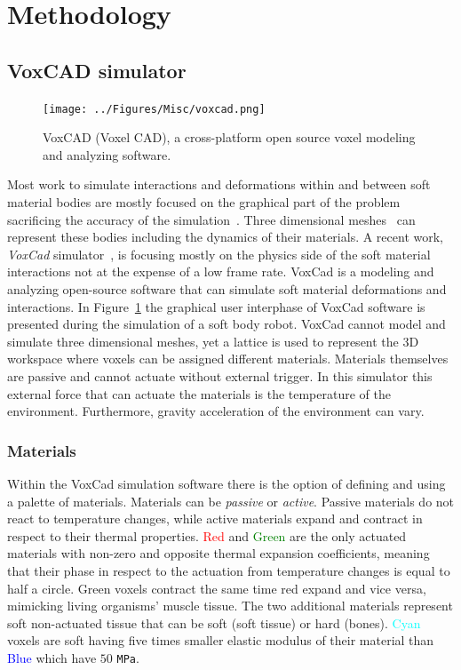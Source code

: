 \documentclass{sig-alternate}
\begin{document}
\section{Methodology}
\subsection{VoxCAD simulator}

\begin{figure}[t!]
\centering
\texttt{[image: ../Figures/Misc/voxcad.png]}
\caption{VoxCAD (Voxel CAD), a cross-platform open source voxel modeling and analyzing software.}
\label{fig:VoxCAD}
\end{figure}

Most work to simulate interactions and deformations within and between soft material bodies are mostly focused on the graphical part of the problem~\cite{faloutsos1997dynamic} sacrificing the accuracy of the simulation~\cite{teschner2004versatile}. Three dimensional meshes~\cite{muller2002stable} can represent these bodies including the dynamics of their materials. A recent work, \emph{VoxCad} simulator~\cite{hiller2012dynamic}, is focusing mostly on the physics side of the soft material interactions not at the expense of a low frame rate. VoxCad is a modeling and analyzing open-source software that can simulate soft material deformations and interactions. In Figure~\ref{fig:VoxCAD} the graphical user interphase of VoxCad software is presented during the simulation of a soft body robot. VoxCad cannot model and simulate three dimensional meshes, yet a lattice is used to represent the 3D workspace where voxels can be assigned different materials. Materials themselves are passive and cannot actuate without external trigger. In this simulator this external force that can actuate the materials is the temperature of the environment. Furthermore, gravity acceleration of the environment can vary.

\subsubsection*{Materials}

Within the VoxCad simulation software there is the option of defining and using a palette of materials. Materials can be \emph{passive} or \emph{active}. Passive materials do not react to temperature changes, while active materials expand and contract in respect to their thermal properties. \textcolor{Red}{Red} and \textcolor{Green}{Green} are the only actuated materials with non-zero and opposite thermal expansion coefficients, meaning that their phase in respect to the actuation from temperature changes is equal to half a circle. Green voxels contract the same time red expand and vice versa, mimicking living organisms' muscle tissue. The two additional materials represent soft non-actuated tissue that can be soft (soft tissue) or hard (bones). \textcolor{Cyan}{Cyan} voxels are soft having five times smaller elastic modulus of their material than \textcolor{Blue}{Blue} which have $50$ \texttt{MPa}.
\end{document}
